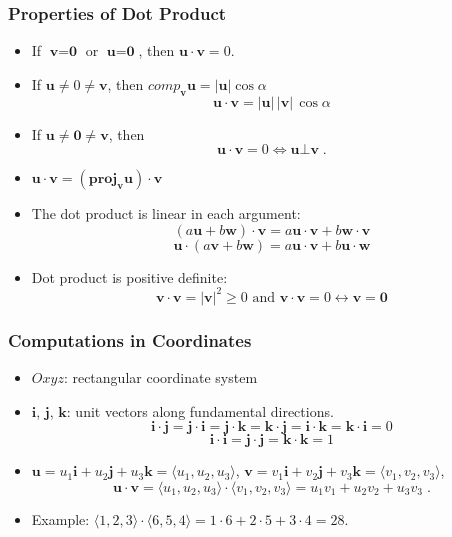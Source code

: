 \begin{frame}
 \frametitle{Properties of Dot Product}

  \begin{itemize}
   \item If $\textbf{v}=\textbf{0}$ or $\textbf{u}=\textbf{0}$, then $\textbf{u}\cdot \textbf{v} =0$.

  \item If $\textbf{u} \neq 0 \neq \textbf{v}$, then $comp_{\bm{v}} \textbf{u} = |\textbf{u}|\cos{\alpha}$
%
$$\textbf{u} \cdot \textbf{v} = |\textbf{u}| \, |\textbf{v}|\,\cos{\alpha}$$
%
\item If $\textbf{u}\neq \textbf{0} \neq \textbf{v}$, then
%
$$\textbf{u} \cdot \textbf{v} = 0 \Longleftrightarrow \textbf{u} \bot \textbf{v}\; .$$
%
\item $\textbf{u} \cdot \textbf{v} = (\textbf{proj}_{\bm{v}} \textbf{u}) \cdot \textbf{v}$

\item The dot product is linear in each argument:
%
$$ (a \textbf{u} + b \textbf{w}) \cdot \textbf{v} = a \textbf{u} \cdot \textbf{v} + b \textbf{w} \cdot \textbf{v}$$
%
$$ \textbf{u} \cdot (a \textbf{v} + b \textbf{w}) = a \textbf{u} \cdot \textbf{v} + b \textbf{u} \cdot \textbf{w}$$

\item Dot product is positive definite:
%
$$\textbf{v} \cdot \textbf{v} = |\textbf{v}|^2 \geqslant 0 \text{ and }
\textbf{v}\cdot \textbf{v} = 0 \leftrightarrow \textbf{v}=\textbf{0}$$
  \end{itemize}

\end{frame}

\begin{frame}
 \frametitle{Computations in Coordinates}

 \begin{itemize}
  \item  $Oxyz$: rectangular coordinate system

  \item $\textbf{i}$, $\textbf{j}$, $\textbf{k}$: unit vectors along fundamental directions.
%
$$ \textbf{i} \cdot \textbf{j} = \textbf{j} \cdot \textbf{i} = \textbf{j} \cdot \textbf{k}
 = \textbf{k} \cdot \textbf{j} = \textbf{i} \cdot \textbf{k} = \textbf{k} \cdot \textbf{i} = 0$$
%
$$\textbf{i} \cdot \textbf{i} = \textbf{j} \cdot \textbf{j} = \textbf{k} \cdot \textbf{k} = 1$$

  \item $\textbf{u} = u_1 \textbf{i} + u_2 \textbf{j} + u_3 \textbf{k} = \langle u_1, u_2, u_3 \rangle$,
 $\textbf{v}=v_1 \textbf{i} + v_2 \textbf{j} + v_3 \textbf{k} = \langle v_1, v_2, v_3 \rangle$,
%
$$\textbf{u} \cdot \textbf{v} = \langle u_1, u_2, u_3 \rangle \cdot \langle v_1, v_2, v_3 \rangle =
u_1v_1 + u_2 v_2 +u_3 v_3\; .$$

\item Example: $\langle 1,2,3 \rangle \cdot \langle 6,5,4 \rangle = 1 \cdot 6 + 2\cdot 5 + 3 \cdot 4 = 28$.
 \end{itemize}
\end{frame}

